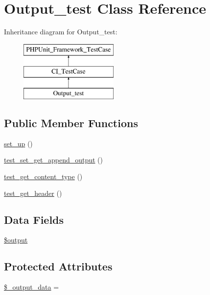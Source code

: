\hypertarget{class_output__test}{}\section{Output\+\_\+test Class Reference}
\label{class_output__test}
Inheritance diagram for Output\+\_\+test\+:\begin{figure}[H]
\begin{center}
\leavevmode
\includegraphics[height=3.000000cm]{class_output__test}
\end{center}
\end{figure}
\subsection*{Public Member Functions}
\begin{DoxyCompactItemize}
\item 
\hyperlink{class_output__test_a69829875c8d4b6ce94908445c4155741}{set\+\_\+up} ()
\item 
\hyperlink{class_output__test_a76196607746f752c5abc5ad955140485}{test\+\_\+set\+\_\+get\+\_\+append\+\_\+output} ()
\item 
\hyperlink{class_output__test_a3060217c16d1d17ad2cdb3fd17f49c51}{test\+\_\+get\+\_\+content\+\_\+type} ()
\item 
\hyperlink{class_output__test_ac577fb66c0bdc276d10341e34084865a}{test\+\_\+get\+\_\+header} ()
\end{DoxyCompactItemize}
\subsection*{Data Fields}
\begin{DoxyCompactItemize}
\item 
\hyperlink{class_output__test_a73004ce9cd673c1bfafd1dc351134797}{\$output}
\end{DoxyCompactItemize}
\subsection*{Protected Attributes}
\begin{DoxyCompactItemize}
\item 
\hyperlink{class_output__test_a61d7c0d5f5f74ecd8ee2991fef02eaa0}{\$\+\_\+output\+\_\+data} = \textquotesingle{}\textquotesingle{}
\end{DoxyCompactItemize}
